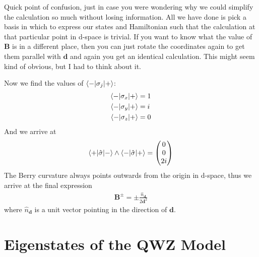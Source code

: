 \begin{shaded}
Quick point of confusion, just in case you were wondering why we could simplify the calculation so much without losing information. All we have done is pick a basis in which to express our states and Hamiltonian such that the calculation at that particular point in d-space is trivial. If you want to know what the value of $\textbf{B}$ is in a different place, then you can just rotate the coordinates again to get them parallel with $\textbf{d}$ and again you get an identical calculation. This might seem kind of obvious, but I had to think about it.
\end{shaded}
Now we find the values of $\braket{-|\sigma_j | +}$:
\begin{align}
    \braket{-|\sigma_x | +} &= 1 \\
    \braket{-|\sigma_y | +} &= i \\
    \braket{-|\sigma_z | +} &= 0 \\
\end{align}
And we arrive at 
\begin{equation}
    \braket{+|\hat{\sigma} | -} \wedge \braket{-|\hat{\sigma} | +} = \begin{pmatrix}
    0 \\
    0 \\
    2i
    \end{pmatrix}
\end{equation}
The Berry curvature always points outwards from the origin in d-space, thus we arrive at the final expression
\begin{align}
    \textbf{B}^{\pm} = \pm \frac{\hat{n}_\textbf{d}}{2\textbf{d}^2}
\end{align}
where $\hat{n}_\textbf{d}$ is a unit vector pointing in the direction of $\textbf{d}$.\par

\section{Eigenstates of the QWZ Model}\label{sec:QWZ_model_appendix}


